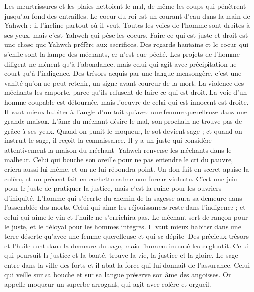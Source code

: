 \begin{multicols}{2}
Les meurtrissures et les plaies nettoient le mal, de même les coups qui pénètrent jusqu'au fond des entrailles.
\VerseOne{}Le coeur du roi est un courant d’eau dans la main de Yahweh ; il l'incline partout où il veut.
Toutes les voies de l'homme sont droites à ses yeux, mais c’est Yahweh qui pèse les coeurs.
Faire ce qui est juste et droit est une chose que Yahweh préfère aux sacrifices.
Des regards hautains et le coeur qui s’enfle sont la lampe des méchants, ce n'est que péché.
Les projets de l’homme diligent ne mènent qu’à l'abondance, mais celui qui agit avec précipitation ne court qu’à l'indigence.
Des trésors acquis par une langue mensongère, c'est une vanité qu’on ne peut retenir, un signe avant-coureur de la mort.
La violence des méchants les emporte, parce qu'ils refusent de faire ce qui est droit.
La voie d’un homme coupable est détournée, mais l'oeuvre de celui qui est innocent est droite.
Il vaut mieux habiter à l’angle d'un toit qu’avec une femme querelleuse dans une grande maison.
L'âme du méchant désire le mal, son prochain ne trouve pas de grâce à ses yeux.
Quand on punit le moqueur, le sot devient sage ; et quand on instruit le sage, il reçoit la connaissance.
Il y a un juste qui considère attentivement la maison du méchant, Yahweh renverse les méchants dans le malheur.
Celui qui bouche son oreille pour ne pas entendre le cri du pauvre, criera aussi lui-même, et on ne lui répondra point.
Un don fait en secret apaise la colère, et un présent fait en cachette calme une fureur violente.
C'est une joie pour le juste de pratiquer la justice, mais c'est la ruine pour les ouvriers d'iniquité.
L'homme qui s’écarte du chemin de la sagesse aura sa demeure dans l'assemblée des morts.
Celui qui aime les réjouissances reste dans l’indigence ; et celui qui aime le vin et l’huile ne s'enrichira pas.
Le méchant sert de rançon pour le juste, et le déloyal pour les hommes intègres.
Il vaut mieux habiter dans une terre déserte qu'avec une femme querelleuse et qui se dépite.
Des précieux trésors et l'huile sont dans la demeure du sage, mais l'homme insensé les engloutit.
Celui qui poursuit la justice et la bonté, trouve la vie, la justice et la gloire.
Le sage entre dans la ville des forts et il abat la force qui lui donnait de l’assurance.
Celui qui veille sur sa bouche et sur sa langue préserve son âme des angoisses.
On appelle moqueur un superbe arrogant, qui agit avec colère et orgueil.

\end{multicols}
